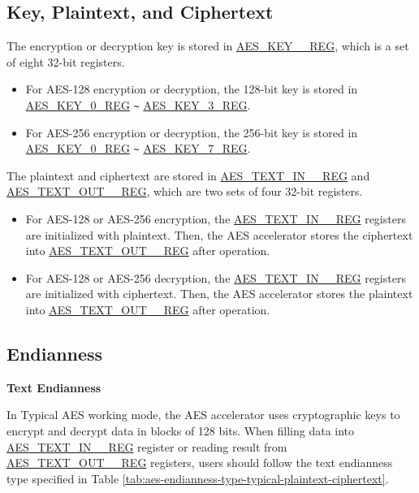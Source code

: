 \documentclass[main\_\_EN.tex]{subfiles}
\begin{document}
\subsection{Key, Plaintext, and Ciphertext}

The encryption or decryption key is stored in \hyperref[regdesc:AESKEYnREG]{AES\_KEY\_\_REG}, which is a set of eight 32-bit registers.

\begin{itemize}
    \item For AES-128 encryption or decryption, the 128-bit key is stored in \hyperref[regdesc:AESKEYnREG]{AES\_KEY\_0\_REG} \verb+~+ \hyperref[regdesc:AESKEYnREG]{AES\_KEY\_3\_REG}.
    \item For AES-256 encryption or decryption, the 256-bit key is stored in \hyperref[regdesc:AESKEYnREG]{AES\_KEY\_0\_REG} \verb+~+ \hyperref[regdesc:AESKEYnREG]{AES\_KEY\_7\_REG}.
\end{itemize}

The plaintext and ciphertext are stored in \hyperref[regdesc:AESTEXTINnREG]{AES\_TEXT\_IN\_\_REG} and \hyperref[regdesc:AESTEXTOUTnREG]{AES\_TEXT\_OUT\_\_REG}, which are two sets of four 32-bit registers.

\begin{itemize}
    \item For AES-128 or AES-256 encryption, the \hyperref[regdesc:AESTEXTINnREG]{AES\_TEXT\_IN\_\_REG} registers are initialized with plaintext. Then, the AES accelerator stores the ciphertext into \hyperref[regdesc:AESTEXTOUTnREG]{AES\_TEXT\_OUT\_\_REG} after operation.
    \item For AES-128 or AES-256 decryption, the \hyperref[regdesc:AESTEXTINnREG]{AES\_TEXT\_IN\_\_REG} registers are initialized with ciphertext. Then, the AES accelerator stores the plaintext into \hyperref[regdesc:AESTEXTOUTnREG]{AES\_TEXT\_OUT\_\_REG} after operation.
\end{itemize}


\subsection{Endianness}

\textbf{Text Endianness}

In Typical AES working mode, the AES accelerator uses cryptographic keys to encrypt and decrypt data in blocks of 128 bits. 
When filling data into \hyperref[regdesc:AESTEXTINnREG]{AES\_TEXT\_IN\_\_REG} register or reading result from \hyperref[regdesc:AESTEXTINnREG]{AES\_TEXT\_OUT\_\_REG} registers, users should follow the text endianness type specified in Table \ref{tab:aes-endianness-type-typical-plaintext-ciphertext}.
\end{document}
